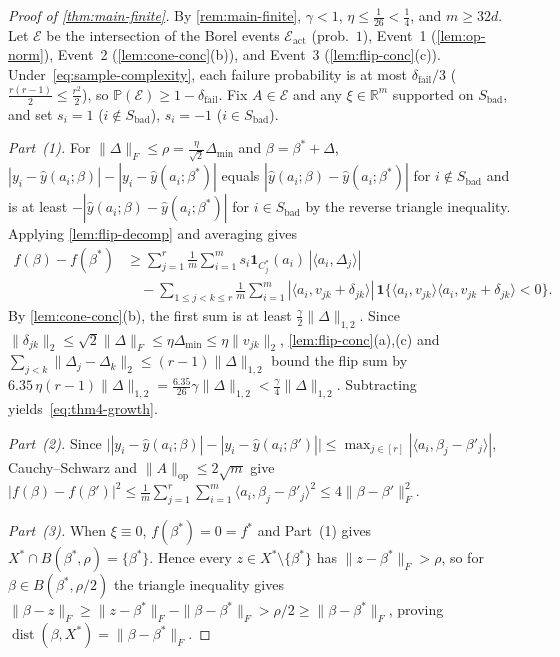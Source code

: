 \documentclass[11pt]{article}
\theoremstyle{plain}
\theoremstyle{remark}
\numberwithin{equation}{section}
\newcommand{\R}{\mathbb{R}}
\newcommand{\Prob}{\mathbb{P}}
\newcommand{\ind}{\mathbf{1}}
\newcommand{\ip}[2]{\langle #1, #2 \rangle}
\newcommand{\norm}[1]{\|#1\|}
\newcommand{\dist}{\operatorname{dist}}
\newcommand{\Fnorm}[1]{\|#1\|_F}
\newcommand{\Lonenorm}[1]{\|#1\|_{1,2}}
\newcommand{\opnorm}[1]{\|#1\|_{\mathrm{op}}}
\begin{document}
\begin{proof}[Proof of \cref{thm:main-finite}]
By \cref{rem:main-finite}, $\gamma < 1$, $\eta \le \frac{1}{26} < \frac{1}{4}$, and $m \ge 32d$. Let $\mathcal{E}$ be the intersection of the Borel events $\mathcal{E}_{\mathrm{act}}$ (prob.~$1$), Event~1 (\cref{lem:op-norm}), Event~2 (\cref{lem:cone-conc}(b)), and Event~3 (\cref{lem:flip-conc}(c)). Under~\eqref{eq:sample-complexity}, each failure probability is at most $\delta_{\mathrm{fail}}/3$ ($\frac{r(r-1)}{2} \le \frac{r^2}{2}$), so $\Prob(\mathcal{E}) \ge 1 - \delta_{\mathrm{fail}}$. Fix $A \in \mathcal{E}$ and any $\xi \in \R^m$ supported on $S_{\mathrm{bad}}$, and set $s_i = 1$ ($i \notin S_{\mathrm{bad}}$), $s_i = -1$ ($i \in S_{\mathrm{bad}}$).

\emph{Part~(1).} For $\Fnorm{\Delta} \le \rho = \frac{\eta}{\sqrt{2}}\Delta_{\min}$ and $\beta = \beta^* + \Delta$, $|y_i - \hat y(a_i; \beta)| - |y_i - \hat y(a_i; \beta^*)|$ equals $|\hat y(a_i; \beta) - \hat y(a_i; \beta^*)|$ for $i \notin S_{\mathrm{bad}}$ and is at least $-|\hat y(a_i; \beta) - \hat y(a_i; \beta^*)|$ for $i \in S_{\mathrm{bad}}$ by the reverse triangle inequality. Applying \cref{lem:flip-decomp} and averaging gives
\begin{align*}
  f(\beta) - f(\beta^*)
  &\ge \sum_{j=1}^r \frac{1}{m}\sum_{i=1}^m s_i \ind_{C_j^*}(a_i)\,|\ip{a_i}{\Delta_j}| \\
  &\quad - \sum_{1\le j < k \le r} \frac{1}{m}\sum_{i=1}^m |\ip{a_i}{v_{jk} + \delta_{jk}}|\,\ind\bigl\{\ip{a_i}{v_{jk}}\ip{a_i}{v_{jk} + \delta_{jk}} < 0\bigr\}.
\end{align*}
By \cref{lem:cone-conc}(b), the first sum is at least $\frac{\gamma}{2}\Lonenorm{\Delta}$. Since $\norm{\delta_{jk}}_2 \le \sqrt{2}\Fnorm{\Delta} \le \eta\Delta_{\min} \le \eta\norm{v_{jk}}_2$, \cref{lem:flip-conc}(a),(c) and $\sum_{j<k}\norm{\Delta_j - \Delta_k}_2 \le (r - 1)\Lonenorm{\Delta}$ bound the flip sum by $6.35\,\eta(r - 1)\Lonenorm{\Delta} = \frac{6.35}{26}\gamma\Lonenorm{\Delta} < \frac{\gamma}{4}\Lonenorm{\Delta}$. Subtracting yields~\eqref{eq:thm4-growth}.

\emph{Part~(2).} Since $\bigl||y_i - \hat y(a_i; \beta)| - |y_i - \hat y(a_i; \beta')|\bigr| \le \max_{j \in [r]} |\ip{a_i}{\beta_j - \beta'_j}|$, Cauchy--Schwarz and $\opnorm{A} \le 2\sqrt{m}$ give $|f(\beta) - f(\beta')|^2 \le \frac{1}{m}\sum_{j=1}^r \sum_{i=1}^m \ip{a_i}{\beta_j - \beta'_j}^2 \le 4\Fnorm{\beta - \beta'}^2$.

\emph{Part~(3).} When $\xi \equiv 0$, $f(\beta^*) = 0 = f^*$ and Part~(1) gives $X^* \cap B(\beta^*, \rho) = \{\beta^*\}$. Hence every $z \in X^* \setminus \{\beta^*\}$ has $\Fnorm{z - \beta^*} > \rho$, so for $\beta \in B(\beta^*, \rho/2)$ the triangle inequality gives $\Fnorm{\beta - z} \ge \Fnorm{z - \beta^*} - \Fnorm{\beta - \beta^*} > \rho/2 \ge \Fnorm{\beta - \beta^*}$, proving $\dist(\beta, X^*) = \Fnorm{\beta - \beta^*}$.
\end{proof}
\end{document}
